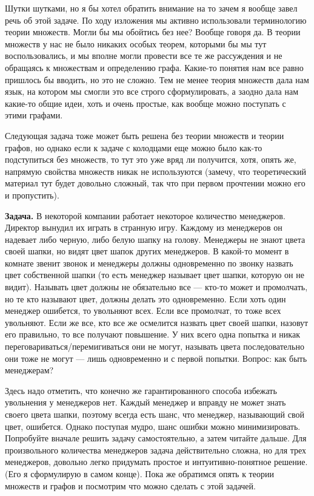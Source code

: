 Шутки шутками, но я бы хотел обратить внимание на то зачем я вообще завел речь об этой задаче. По ходу изложения мы активно использовали терминологию теории множеств. Могли бы мы обойтись без нее? Вообще говоря да. В теории множеств у нас не было никаких особых теорем, которыми бы мы тут воспользовались, и мы вполне могли провести все те же рассуждения и не обращаясь к множествам и определению графа. Какие-то понятия нам все равно пришлось бы вводить, но это не сложно. Тем не менее теория множеств дала нам язык, на котором мы смогли это все строго сформулировать, а заодно дала нам какие-то общие идеи, хоть и очень простые, как вообще можно поступать с этими графами.

Следующая задача тоже может быть решена без теории множеств и теории графов, но однако если к задаче с колодцами еще можно было как-то подступиться без множеств, то тут это уже вряд ли получится, хотя, опять же, напрямую свойства множеств никак не используются (замечу, что теоретический материал тут будет довольно сложный, так что при первом прочтении можно его и пропустить).

{\bfseries Задача.} В некоторой компании работает некоторое количество менеджеров. Директор вынудил их играть в странную игру. Каждому из менеджеров он надевает либо черную, либо белую шапку на голову. Менеджеры не знают цвета своей шапки, но видят цвет шапок других менеджеров. В какой-то момент в комнате звенит звонок и менеджеры должны одновременно по звонку назвать цвет собственной шапки (то есть менеджер называет цвет шапки, которую он не видит). Называть цвет должны не обязательно все — кто-то может и промолчать, но те кто называют цвет, должны делать это одновременно. Если хоть один менеджер ошибется, то увольняют всех.  Если все промолчат, то тоже всех увольняют. Если же все, кто все же осмелится назвать цвет своей шапки, назовут его правильно, то все получают повышение. У них всего одна попытка и никак переговариваться/перемигиваться они не могут, называть цвета последовательно они тоже не могут — лишь одновременно и с первой попытки. Вопрос: как быть менеджерам?

Здесь надо отметить, что конечно же гарантированного способа избежать увольнения у менеджеров нет. Каждый менеджер и вправду не может знать своего цвета шапки, поэтому всегда есть шанс, что менеджер, называющий свой цвет, ошибется. Однако поступая мудро, шанс ошибки можно минимизировать. Попробуйте вначале решить задачу самостоятельно, а затем читайте дальше. Для произвольного количества менеджеров задача действительно сложна, но для трех менеджеров, довольно легко придумать простое и интуитивно-понятное решение. (Его я сформулирую в самом конце). Пока же обратимся опять к теории множеств и графов и посмотрим что можно сделать с этой задачей.

